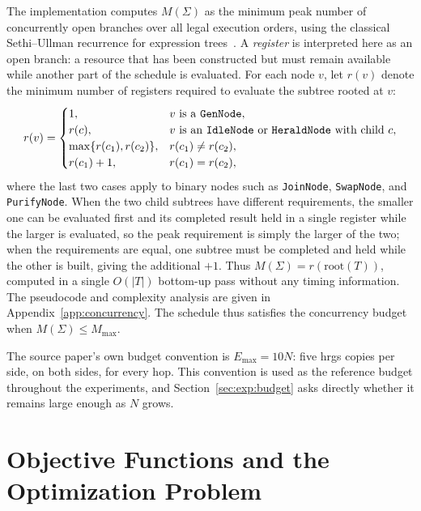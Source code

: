 The implementation computes $M(\Sigma)$ as the minimum peak number of concurrently open branches over all legal execution orders, using the classical Sethi--Ullman recurrence for expression trees~\cite{Sethi1970Generation}. A \emph{register} is interpreted here as an open branch: a resource that has been constructed but must remain available while another part of the schedule is evaluated. For each node $v$, let $r(v)$ denote the minimum number of registers required to evaluate the subtree rooted at $v$:
\[
    r(v) =
    \begin{cases}
        1, & v\text{ is a \texttt{GenNode}},\\
        r(c), & v\text{ is an \texttt{IdleNode} or \texttt{HeraldNode} with child }c,\\
        \max\{r(c_1),r(c_2)\}, & r(c_1)\neq r(c_2),\\
        r(c_1)+1, & r(c_1)=r(c_2),
    \end{cases}
\]
where the last two cases apply to binary nodes such as \texttt{JoinNode}, \texttt{SwapNode}, and \texttt{PurifyNode}. When the two child subtrees have different requirements, the smaller one can be evaluated first and its completed result held in a single register while the larger is evaluated, so the peak requirement is simply the larger of the two; when the requirements are equal, one subtree must be completed and held while the other is built, giving the additional $+1$. Thus $M(\Sigma)=r(\mathrm{root}(T))$, computed in a single $O(|T|)$ bottom-up pass without any timing information. The pseudocode and complexity analysis are given in Appendix~\ref{app:concurrency}. The schedule thus satisfies the concurrency budget when $M(\Sigma)\leq M_{\max}$.

The source paper's own budget convention is $E_{\max} = 10N$: five \Gls{hrgs} copies per side, on both sides, for every hop. This convention is used as the reference budget throughout the experiments, and Section~\ref{sec:exp:budget} asks directly whether it remains large enough as $N$ grows.

\section{Objective Functions and the Optimization Problem}
\label{sec:model:objectives}


